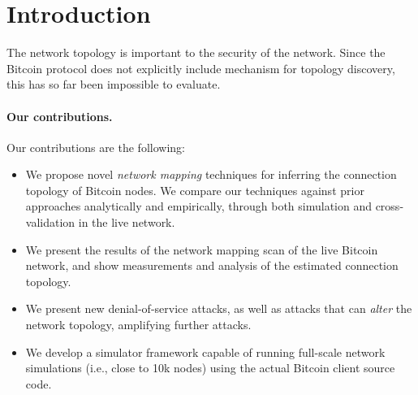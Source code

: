 \newcommand{\bc}{Bitcoin\xspace}

\section{Introduction}

The network topology is important to the security of the network. Since the \bc protocol does not explicitly include mechanism for topology discovery, this has so far been impossible to evaluate.

\paragraph{Our contributions.} Our contributions are the following:
\begin{itemize}[leftmargin=*]
\item We propose novel \emph{network mapping} techniques for inferring the connection topology of Bitcoin nodes. We compare our techniques against prior approaches analytically and empirically, through both simulation and cross-validation in the live network.
\item We present the results of the network mapping scan of the live Bitcoin network, and show measurements and analysis of the estimated connection topology.
\item We present new denial-of-service attacks, as well as attacks that can \emph{alter} the network topology, amplifying further attacks.
\item We develop a simulator framework capable of running full-scale network simulations (i.e., close to 10k nodes) using the actual Bitcoin client source code.
\end{itemize}
